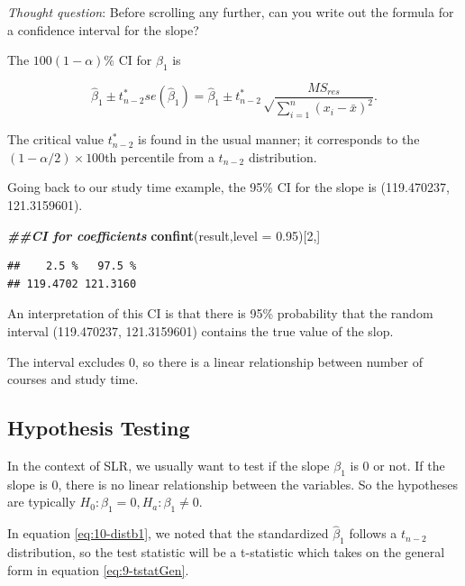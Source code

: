 \documentclass[
]{book}
\newenvironment{Shaded}{\begin{snugshade}}{\end{snugshade}}
\newcommand{\AttributeTok}[1]{\textcolor[rgb]{0.13,0.29,0.53}{#1}}
\newcommand{\DecValTok}[1]{\textcolor[rgb]{0.00,0.00,0.81}{#1}}
\newcommand{\DocumentationTok}[1]{\textcolor[rgb]{0.56,0.35,0.01}{\textbf{\textit{#1}}}}
\newcommand{\FloatTok}[1]{\textcolor[rgb]{0.00,0.00,0.81}{#1}}
\newcommand{\FunctionTok}[1]{\textcolor[rgb]{0.13,0.29,0.53}{\textbf{#1}}}
\newcommand{\NormalTok}[1]{#1}
\begin{document}
\emph{Thought question}: Before scrolling any further, can you write out the formula for a confidence interval for the slope?

The \(100(1-\alpha)\%\) CI for \(\beta_1\) is

\begin{equation} 
\hat{\beta}_1 \pm t_{n-2}^*  se(\hat{\beta}_1) = \hat{\beta}_1 \pm t_{n-2}^* {\sqrt\frac{MS_{res}}{\sum_{i=1}^n(x_i - \bar{x})^{2}}}.
\label{eq:10-CIb1}
\end{equation}

The critical value \(t_{n-2}^*\) is found in the usual manner; it corresponds to the \((1 - \alpha/2) \times 100\)th percentile from a \(t_{n-2}\) distribution.

Going back to our study time example, the 95\% CI for the slope is (119.470237, 121.3159601).

\begin{Shaded}
\begin{Highlighting}[]
\DocumentationTok{\#\#CI for coefficients}
\FunctionTok{confint}\NormalTok{(result,}\AttributeTok{level =} \FloatTok{0.95}\NormalTok{)[}\DecValTok{2}\NormalTok{,]}
\end{Highlighting}
\end{Shaded}

\begin{verbatim}
##    2.5 %   97.5 % 
## 119.4702 121.3160
\end{verbatim}

An interpretation of this CI is that there is 95\% probability that the random interval (119.470237, 121.3159601) contains the true value of the slop.

The interval excludes 0, so there is a linear relationship between number of courses and study time.

\subsection{Hypothesis Testing}\label{hypothesis-testing-1}

In the context of SLR, we usually want to test if the slope \(\beta_1\) is 0 or not. If the slope is 0, there is no linear relationship between the variables. So the hypotheses are typically \(H_0: \beta_1 = 0, H_a: \beta_1 \neq 0.\)

In equation \eqref{eq:10-distb1}, we noted that the standardized \(\hat{\beta}_1\) follows a \(t_{n-2}\) distribution, so the test statistic will be a t-statistic which takes on the general form in equation \eqref{eq:9-tstatGen}.
\end{document}
